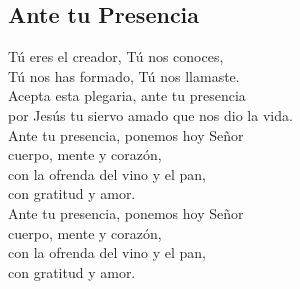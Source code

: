 \subsection{Ante tu Presencia}

\begin{center}

{\Large
Tú eres el creador, Tú nos conoces,\\ 
Tú nos has formado, Tú nos llamaste.\\
\vspace{2em}
Acepta esta plegaria, ante tu presencia \\
por Jesús tu siervo amado que nos dio la vida.\\
\vspace{2em}
Ante tu presencia, ponemos hoy Señor  \\
cuerpo, mente y corazón,\\
con la ofrenda del vino y el pan, \\
con gratitud y amor.\\
\vspace{2em}
Ante tu presencia, ponemos hoy Señor  \\
cuerpo, mente y corazón,\\
con la ofrenda del vino y el pan, \\
con gratitud y amor.\\
}
\end{center}
